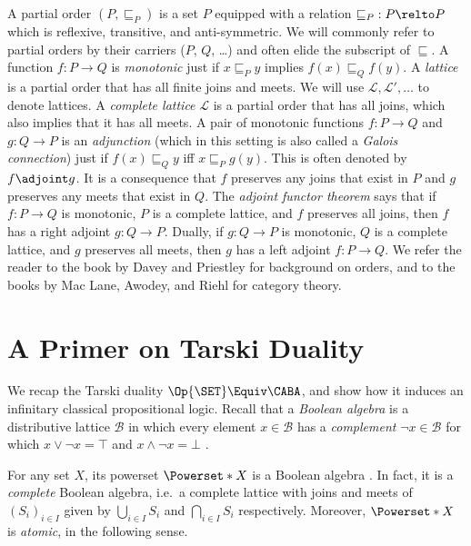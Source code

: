\documentclass[a4paper,UKenglish,cleveref, autoref]{lipics-v2021}
\begin{document}
A partial order $(P, \sqsubseteq_P)$ is a set $P$ equipped with a relation
$\mathord{\sqsubseteq_P} : P \relto P$ which is reflexive, transitive, and
anti-symmetric. We will commonly refer to partial orders by their carriers ($P$,
$Q$, \ldots) and often elide the subscript of $\sqsubseteq$. A function $f : P
\to Q$ is \emph{monotonic} just if $x \sqsubseteq_P y$ implies $f(x)
\sqsubseteq_Q f(y)$. A \emph{lattice} is a partial order that has all finite
joins and meets. We will use $\mathcal{L}, \mathcal{L}', \ldots$ to denote
lattices. A \emph{complete lattice} $\mathcal{L}$ is a partial order that has
all joins, which also implies that it has all meets. A pair of monotonic
functions $f : P \to Q$ and $g : Q \to P$ is an \emph{adjunction} (which in this
setting is also called a \emph{Galois connection}) just if $f(x) \sqsubseteq_Q
y$ iff $x \sqsubseteq_P g(y)$. This is often denoted by $f \adjoint g$. It is a
consequence that $f$ preserves any joins that exist in $P$ and $g$ preserves any
meets that exist in $Q$. The \emph{adjoint functor theorem} \cite[\S
7.34]{davey_2002} \cite[\S I.4.2]{johnstone_1982} says that if $f : P \to Q$ is
monotonic, $P$ is a complete lattice, and $f$ preserves all joins, then $f$ has
a right adjoint $g : Q \to P$. Dually, if \(g : Q \to P\) is monotonic, \(Q\) is
a complete lattice, and \(g\) preserves all meets, then \(g\) has a left adjoint
\(f : P \to Q\). We refer the reader to the book by Davey and Priestley
\cite{davey_2002} for background on orders, and to the books by Mac Lane,
Awodey, and Riehl \cite{mac_lane_1978,awodey_2010,riehl_2016} for category
theory.


\section{A Primer on Tarski Duality}\label{section:tarski}

We recap the Tarski duality $\Op{\SET} \Equiv \CABA$, and show how it induces an
infinitary classical propositional logic. Recall that a \emph{Boolean algebra}
is a distributive lattice $\mathcal{B}$ in which every element $x \in
\mathcal{B}$ has a \emph{complement} $\lnot x \in \mathcal{B}$ for which $x \lor
\lnot x = \top$ and $x \land \lnot x = \bot$ \cite{johnstone_1982}.

For any set $X$, its powerset $\Powerset*{X}$ is a Boolean algebra \cite[\S
5.2]{davey_2002}. In fact, it is a \emph{complete} Boolean algebra, i.e.\ a complete
lattice with joins and meets of $(S_i)_{i \in I}$ given by $\bigcup_{i \in I} S_i$ and
$\bigcap_{i \in I} S_i$ respectively. Moreover, $\Powerset*{X}$ is \emph{atomic}, in the
following sense.
\end{document}
